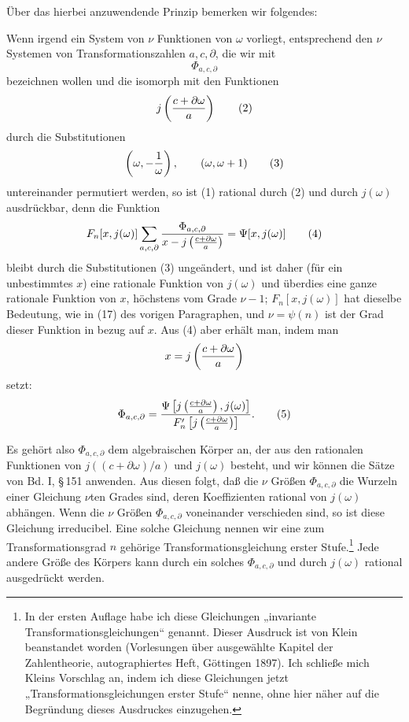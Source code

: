 \documentclass[11pt]{article}
\begin{document}
Über das hierbei anzuwendende Prinzip bemerken wir folgendes:

Wenn irgend ein System von $\nu$ Funktionen von $\omega$ vorliegt, entsprechend den $\nu$ Systemen von Transformationszahlen $a,c,\partial$, die wir mit
\begin{equation}
 \Phi_{a,c,\partial}
\tag{1}
\end{equation}
bezeichnen wollen und die isomorph mit den Funktionen
\begin{equation}
 j\left({c+\partial\omega\over a}\right)
\tag{2}
\end{equation}
durch die Substitutionen
\begin{equation}
 \left(\omega,-{1\over\omega}\right),\qquad (\omega,\omega+1)
\tag{3}
\end{equation}
untereinander permutiert werden, so ist (1) rational durch (2) und durch $j(\omega)$ ausdrückbar, denn die Funktion
\begin{equation}
 F_n[x,j(\omega)]\sum_{a,c,\partial}{\Phi_{a,c,\partial}\over x-j\left({c+\partial\omega\over a}\right)}=\Psi[x,j(\omega)]
\tag{4}
\end{equation}
bleibt durch die Substitutionen (3) ungeändert, und ist daher (für ein unbestimmtes $x$) eine rationale Funktion von $j(\omega)$ und überdies eine ganze rationale Funktion von $x$, höchstens vom Grade $\nu-1$; $F_n[x,j(\omega)]$ hat dieselbe Bedeutung, wie in (17) des vorigen Paragraphen, und $\nu=\psi(n)$ ist der Grad dieser Funktion in bezug auf $x$. Aus (4) aber erhält man, indem man
\[
 x=j\left({c+\partial\omega\over a}\right)
\]
setzt:
\begin{equation}
 \Phi_{a,c,\partial}={\Psi\left[j\left({c+\partial\omega\over a}\right),j(\omega)\right]
 \over F'_n\left[j\left({c+\partial\omega\over a}\right)\right]}.
\tag{5}
\end{equation}

Es gehört also $\Phi_{a,c,\partial}$ dem algebraischen Körper an, der aus den rationalen Funktionen von $j((c+\partial\omega)/a)$ und $j(\omega)$ besteht, und wir können die Sätze von Bd. I, \S\,151 anwenden. Aus diesen folgt, daß die $\nu$ Größen $\Phi_{a,c,\partial}$ die Wurzeln einer Gleichung $\nu$ten Grades sind, deren Koeffizienten rational von $j(\omega)$ abhängen. Wenn die $\nu$ Größen $\Phi_{a,c,\partial}$ voneinander verschieden sind, so ist diese Gleichung irreducibel. Eine solche Gleichung nennen wir eine zum Transformationsgrad $n$ gehörige Transformationsgleichung erster Stufe.\footnote{In der ersten Auflage habe ich diese Gleichungen „invariante Transformationsgleichungen“ genannt. Dieser Ausdruck ist von Klein beanstandet worden (Vorlesungen über ausgewählte Kapitel der Zahlentheorie, autographiertes Heft, Göttingen 1897). Ich schließe mich Kleins Vorschlag an, indem ich diese Gleichungen jetzt „Transformationsgleichungen erster Stufe“ nenne, ohne hier näher auf die Begründung dieses Ausdruckes einzugehen.} Jede andere Größe des Körpers kann durch ein solches $\Phi_{a,c,\partial}$ und durch $j(\omega)$ rational ausgedrückt werden.
\end{document}
